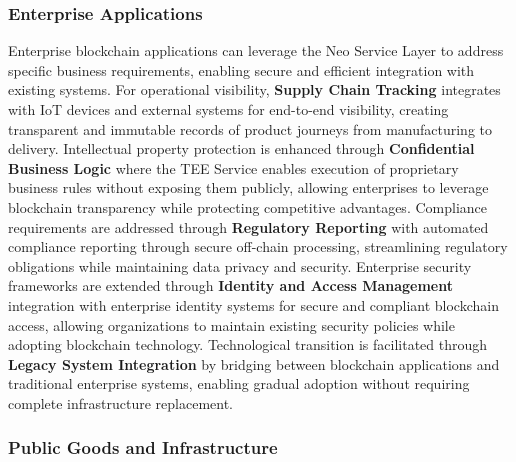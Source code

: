 \documentclass[11pt]{article}
\begin{document}
\subsubsection{Enterprise Applications}
\label{subsubsec:enterprise}

Enterprise blockchain applications can leverage the Neo Service Layer to address specific business requirements, enabling secure and efficient integration with existing systems. For operational visibility, \textbf{Supply Chain Tracking} integrates with IoT devices and external systems for end-to-end visibility, creating transparent and immutable records of product journeys from manufacturing to delivery. Intellectual property protection is enhanced through \textbf{Confidential Business Logic} where the TEE Service enables execution of proprietary business rules without exposing them publicly, allowing enterprises to leverage blockchain transparency while protecting competitive advantages. Compliance requirements are addressed through \textbf{Regulatory Reporting} with automated compliance reporting through secure off-chain processing, streamlining regulatory obligations while maintaining data privacy and security. Enterprise security frameworks are extended through \textbf{Identity and Access Management} integration with enterprise identity systems for secure and compliant blockchain access, allowing organizations to maintain existing security policies while adopting blockchain technology. Technological transition is facilitated through \textbf{Legacy System Integration} by bridging between blockchain applications and traditional enterprise systems, enabling gradual adoption without requiring complete infrastructure replacement.

\subsubsection{Public Goods and Infrastructure}
\label{subsubsec:public-goods}
\end{document}
